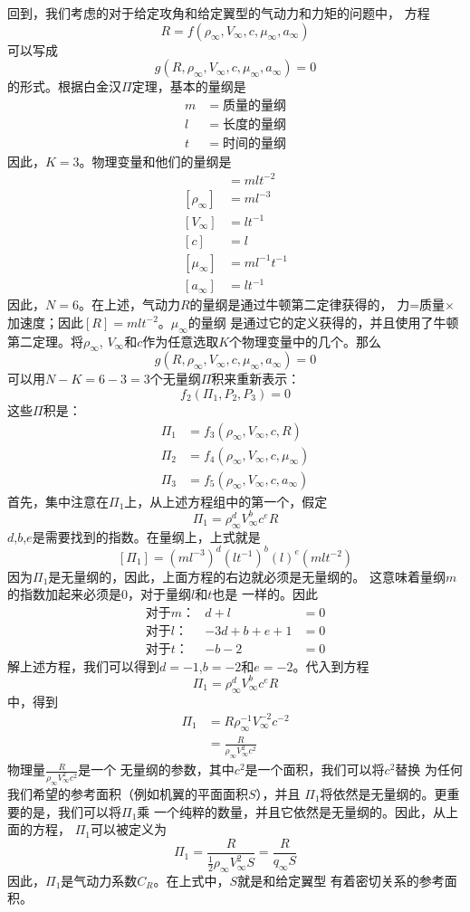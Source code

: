 回到，我们考虑的对于给定攻角和给定翼型的气动力和力矩的问题中，
方程
\[
  R=f(\rho_\infty,V_\infty,c,\mu_\infty,a_\infty)
\]
可以写成
\[
  g(R,\rho_\infty,V_\infty,c,\mu_\infty,a_\infty)=0
\]
的形式。根据白金汉$\Pi$定理，基本的量纲是
\begin{align*}
  m&=质量的量纲\\ 
  l&=长度的量纲\\ 
  t&=时间的量纲
\end{align*}
因此，$K=3 $。物理变量和他们的量纲是
\begin{align*}
  [R]&=mlt^{-2}\\ 
  [\rho_\infty]&=ml^{-3}\\ 
  [V_\infty]&=lt^{-1}\\ 
  [c]&=l\\ 
  [\mu_\infty]&=ml^{-1}t^{-1}\\ 
  [a_\infty]&=lt^{-1}
\end{align*}
因此，$N=6$。在上述，气动力$R$的量纲是通过牛顿第二定律获得的，
力=质量$\times$加速度；因此$[R]=mlt^{-2}$。$\mu_\infty$的量纲
是通过它的定义获得的，并且使用了牛顿第二定理。将$\rho_\infty$,
$V_\infty$和$c$作为任意选取$K$个物理变量中的几个。那么
\[
  g(R,\rho_\infty,V_\infty,c,\mu_\infty,a_\infty)=0
\]
可以用$N-K=6-3=3$个无量纲$\Pi$积来重新表示：
\[
  f_2(\Pi_1,P_2,P_3)=0
\]
这些$\Pi$积是：
\begin{align*}
  \Pi_1&=f_3(\rho_\infty,V_\infty,c,R)\\ 
  \Pi_2&=f_4(\rho_\infty,V_\infty,c,\mu_\infty)\\ 
  \Pi_3&=f_5(\rho_\infty,V_\infty,c,a_\infty)
\end{align*}
首先，集中注意在$\Pi_1$上，从上述方程组中的第一个，假定
\[
  \Pi_1=\rho_\infty ^d V_\infty ^b c^e R 
\]
$d$,$b$,$e$是需要找到的指数。在量纲上，上式就是
\[
  [\Pi_1]=(ml^{-3})^d(lt^{-1})^b(l)^e(mlt^{-2})
\]
因为$\Pi_1$是无量纲的，因此，上面方程的右边就必须是无量纲的。
这意味着量纲$m$的指数加起来必须是0，对于量纲$l$和$t$也是
一样的。因此
\begin{align*}
  对于m：& d+l&=0\\ 
  对于l：&-3d+b+e+1&=0\\ 
  对于t：&-b-2&=0
\end{align*}
解上述方程，我们可以得到$d=-1$,$b=-2$和$e=-2$。代入到方程
\[
  \Pi_1=\rho_\infty ^d V_\infty ^b c^e R 
\]
中，得到
\[
  \begin{split} 
    \Pi_1&=R \rho_\infty ^{-1} V_\infty ^{-2} c^{-2}\\ 
         &=\frac{R}{\rho_\infty V_\infty ^2 c^2}
  \end{split}
\]
物理量$\frac{R}{\rho_\infty V_\infty ^2 c^2}$是一个
无量纲的参数，其中$c^2$是一个面积，我们可以将$c^2$替换
为任何我们希望的参考面积（例如机翼的平面面积$S$），并且
$\Pi_1$将依然是无量纲的。更重要的是，我们可以将$\Pi_1$乘
一个纯粹的数量，并且它依然是无量纲的。因此，从上面的方程，
$\Pi_1$可以被定义为
\[
  \Pi_1=\frac{R}{\frac{1}{2}\rho_\infty V_\infty ^2 S}=\frac{R}{q_\infty S}
\]
因此，$\Pi_1$是气动力系数$C_R$。在上式中，$S$就是和给定翼型
有着密切关系的参考面积。

